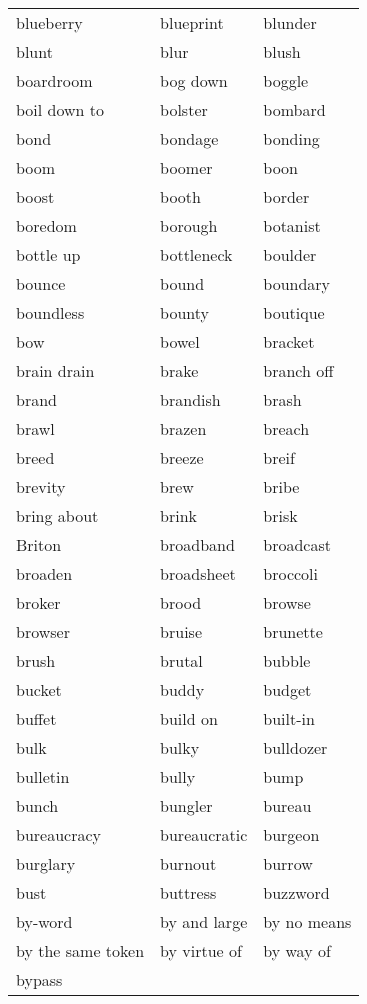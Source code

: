 \documentclass{minimal}
\begin{document}
\begin{longtable}{p{2.7cm}@{\hskip 0.2cm}p{2.7cm}@{\hskip 0.2cm}p{2.7cm}}
blueberry & blueprint & blunder \\
blunt & blur & blush \\
boardroom & bog down & boggle \\
boil down to & bolster & bombard \\
bond & bondage & bonding \\
boom & boomer & boon \\
boost & booth & border \\
boredom & borough & botanist \\
bottle up & bottleneck & boulder \\
bounce & bound & boundary \\
boundless & bounty & boutique \\
bow & bowel & bracket \\
brain drain & brake & branch off \\
brand & brandish & brash \\
brawl & brazen & breach \\
breed & breeze & breif \\
brevity & brew & bribe \\
bring about & brink & brisk \\
Briton & broadband & broadcast \\
broaden & broadsheet & broccoli \\
broker & brood & browse \\
browser & bruise & brunette \\
brush & brutal & bubble \\
bucket & buddy & budget \\
buffet & build on & built-in \\
bulk & bulky & bulldozer \\
bulletin & bully & bump \\
bunch & bungler & bureau \\
bureaucracy & bureaucratic & burgeon \\
burglary & burnout & burrow \\
bust & buttress & buzzword \\
by-word & by and large & by no means \\
by the same token & by virtue of & by way of \\
bypass
\end{longtable}
\end{document}
